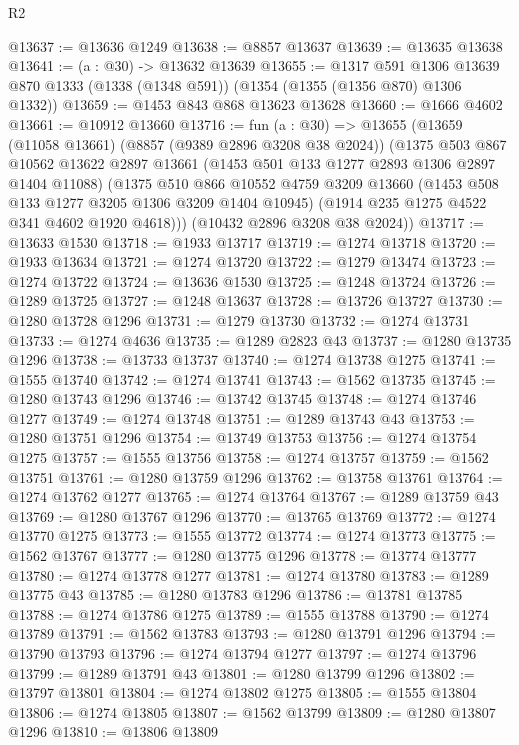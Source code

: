 \begin{lexlean}{R2}
\begin{coremodule}
@13637 := @13636 @1249
@13638 := @8857 @13637
@13639 := @13635 @13638
@13641 := (a : @30) -> @13632 @13639
@13655 := @1317
    @591
    @1306
    @13639
    @870
    @1333
    (@1338 (@1348 @591))
    (@1354 (@1355 (@1356 @870) @1306 @1332))
@13659 := @1453 @843 @868 @13623 @13628
@13660 := @1666 @4602
@13661 := @10912 @13660
@13716 := fun (a : @30) =>
  @13655
    (@13659
      (@11058 @13661)
      (@8857 (@9389 @2896 @3208 @38 @2024))
      (@1375
        @503
        @867
        @10562
        @13622
        @2897
        @13661
        (@1453 @501 @133 @1277 @2893 @1306 @2897 @1404 @11088)
        (@1375
          @510
          @866
          @10552
          @4759
          @3209
          @13660
          (@1453 @508 @133 @1277 @3205 @1306 @3209 @1404 @10945)
          (@1914 @235 @1275 @4522 @341 @4602 @1920 @4618)))
      (@10432 @2896 @3208 @38 @2024))
@13717 := @13633 @1530
@13718 := @1933 @13717
@13719 := @1274 @13718
@13720 := @1933 @13634
@13721 := @1274 @13720
@13722 := @1279 @13474
@13723 := @1274 @13722
@13724 := @13636 @1530
@13725 := @1248 @13724
@13726 := @1289 @13725
@13727 := @1248 @13637
@13728 := @13726 @13727
@13730 := @1280 @13728 @1296
@13731 := @1279 @13730
@13732 := @1274 @13731
@13733 := @1274 @4636
@13735 := @1289 @2823 @43
@13737 := @1280 @13735 @1296
@13738 := @13733 @13737
@13740 := @1274 @13738 @1275
@13741 := @1555 @13740
@13742 := @1274 @13741
@13743 := @1562 @13735
@13745 := @1280 @13743 @1296
@13746 := @13742 @13745
@13748 := @1274 @13746 @1277
@13749 := @1274 @13748
@13751 := @1289 @13743 @43
@13753 := @1280 @13751 @1296
@13754 := @13749 @13753
@13756 := @1274 @13754 @1275
@13757 := @1555 @13756
@13758 := @1274 @13757
@13759 := @1562 @13751
@13761 := @1280 @13759 @1296
@13762 := @13758 @13761
@13764 := @1274 @13762 @1277
@13765 := @1274 @13764
@13767 := @1289 @13759 @43
@13769 := @1280 @13767 @1296
@13770 := @13765 @13769
@13772 := @1274 @13770 @1275
@13773 := @1555 @13772
@13774 := @1274 @13773
@13775 := @1562 @13767
@13777 := @1280 @13775 @1296
@13778 := @13774 @13777
@13780 := @1274 @13778 @1277
@13781 := @1274 @13780
@13783 := @1289 @13775 @43
@13785 := @1280 @13783 @1296
@13786 := @13781 @13785
@13788 := @1274 @13786 @1275
@13789 := @1555 @13788
@13790 := @1274 @13789
@13791 := @1562 @13783
@13793 := @1280 @13791 @1296
@13794 := @13790 @13793
@13796 := @1274 @13794 @1277
@13797 := @1274 @13796
@13799 := @1289 @13791 @43
@13801 := @1280 @13799 @1296
@13802 := @13797 @13801
@13804 := @1274 @13802 @1275
@13805 := @1555 @13804
@13806 := @1274 @13805
@13807 := @1562 @13799
@13809 := @1280 @13807 @1296
@13810 := @13806 @13809

\end{coremodule}
\end{lexlean}
